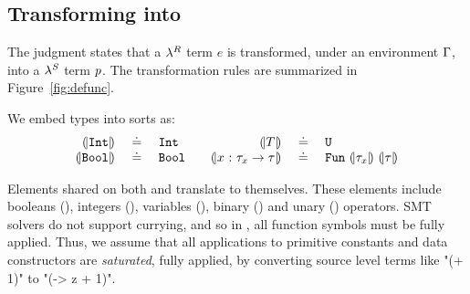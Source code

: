 \subsection{Transforming \corelan into \smtlan}
%
\label{subsec:appendix:embedding}


%
The judgment
states that a $\lambda^{R}$ term $e$ is transformed,
under an environment $\Gamma$, into a
$\lambda^{\mathit{S}}$ term $p$.
%
The transformation rules are summarized in Figure~\ref{fig:defunc}.

%
We embed \corelan types into \smtlan sorts as:
%
$$
\begin{array}{rclcrcl}
\embed{\tint}                       & \defeq &  \tint &  &
\embed{T}                           & \defeq &  \tuniv \\
\embed{\tbool}                      & \defeq &  \tbool & &
\embed{\tfun{x}{\typ_x}{\typ}} & \defeq & \tsmtfun{\embed{\typ_x}}{\embed{\typ}}
\end{array}
$$

%
Elements shared on both \corelan and \smtlan
translate to themselves.
%
These elements include
booleans (\lgbool),
integers (\lgint),
variables (\lgvar),
binary (\lgbinGEN)
and unary (\lgun)
operators.
%
SMT solvers do not support currying,
and so in \smtlan, all function symbols
must be fully applied.
%
Thus, we assume that all applications
to primitive constants and data
constructors are \emph{saturated},
\ie fully applied, \eg by converting
source level terms like "(+ 1)" to
"(\z -> z + 1)".
%




